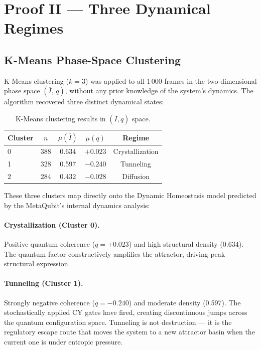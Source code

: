 \documentclass[twocolumn,amsmath,amssymb,prl]{revtex4-2}
\begin{document}
\section{Proof II — Three Dynamical Regimes}
\label{sec:regimes}

\subsection{K-Means Phase-Space Clustering}

K-Means clustering ($k = 3$) was applied to all 1\,000 frames in the
two-dimensional phase space $(\overline{I},\, q)$, without any prior
knowledge of the system's dynamics.  The algorithm recovered three distinct
dynamical states:

\begin{table}[h]
\centering
\caption{K-Means clustering results in $(\overline{I}, q)$ space.}
\label{tab:kmeans}
\begin{tabular}{lcccc}
\toprule
Cluster & $n$ & $\mu(\overline{I})$ & $\mu(q)$ & Regime \\
\midrule
0 & 388 & 0.634 & $+0.023$ & Crystallization \\
1 & 328 & 0.597 & $-0.240$ & Tunneling \\
2 & 284 & 0.432 & $-0.028$ & Diffusion \\
\bottomrule
\end{tabular}
\end{table}

These three clusters map directly onto the Dynamic Homeostasis model
predicted by the MetaQubit's internal dynamics analysis:

\paragraph{Crystallization (Cluster 0).}  Positive quantum coherence ($q = +0.023$)
and high structural density (0.634).  The quantum factor constructively
amplifies the attractor, driving peak structural expression.

\paragraph{Tunneling (Cluster 1).}  Strongly negative coherence ($q = -0.240$)
and moderate density (0.597).  The stochastically applied CY gates have
fired, creating discontinuous jumps across the quantum configuration space.
Tunneling is not destruction — it is the regulatory escape route that
moves the system to a new attractor basin when the current one is under
entropic pressure.
\end{document}
